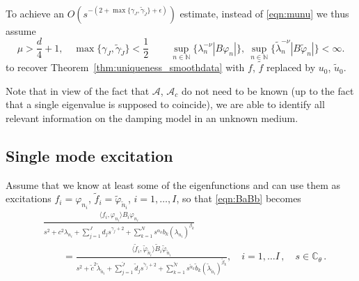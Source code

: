 \begin{remark}
{}
\\
To achieve an $O(s^{-(2+\max\{\gamma_J,\tilde{\gamma}_{\tilde{J}}\}+\epsilon)})$ estimate, instead of \eqref{eqn:munu} we thus assume
\begin{equation}\label{eqn:munu_u0}
\mu>\frac{d}{4}+1,\quad \max\{\gamma_J,\tilde{\gamma}_{\tilde{J}}\}<\frac12\, \quad
\quad
\sup_{n\in\mathbb{N}} \{\lambda_n^{-\nu}|B\varphi_n|\}, \ \sup_{n\in\mathbb{N}} \{\tilde{\lambda}_n^{-\nu}|B\tilde{\varphi}_n|\} <\infty.
\end{equation}
to recover Theorem~\ref{thm:uniqueness_smoothdata} with $f$, $\tilde{f}$ replaced by $u_0$, $\tilde{u}_0$.
\end{remark}

\begin{remark}
Note that in view of the fact that $\mathcal{A}$, $\mathcal{A}_c$ do not need to be known (up to the fact that a single eigenvalue is supposed to coincide), we are able to identify all relevant information on the damping model in an unknown medium.
\end{remark}


\subsection{Single mode excitation}\label{sec:singlemode}
Assume that we know at least some of the eigenfunctions and can use them as excitations $f_{i}=\varphi_{n_i}$, $\tilde{f}_{i}=\tilde{\varphi}_{\tilde{n}_i}$, $i=1,\ldots, I$, so that \eqref{eqn:BaBb} becomes
\begin{equation}\label{eqn:BaBb_singlemodes}
\begin{aligned}
&\frac{\langle f_{i},\varphi_{n_i}\rangle B_i\varphi_{n_i}}{
s^2+c^2\lambda_{n_i}+\sum_{j=1}^J d_j s^{\gamma_j+2}+\sum_{k=1}^N s^{\alpha_k} b_{k}(\lambda_{n_i})^{\beta_{k}}}\\
&\qquad=
\frac{\langle {\tilde f}_{i},{\tilde \varphi}_{\tilde{n}_i}\rangle {\tilde B}_i {\tilde \varphi}_{\tilde{n}_i}}{
s^2+{\tilde c}^2 {\tilde \lambda}_{\tilde{n}_i}+\sum_{j=1}^{\tilde{J}} \tilde{d}_j s^{\tilde{\gamma}_j+2}+\sum_{k=1}^{\tilde N} s^{{\tilde \alpha}_k} {\tilde b}_{k}({\tilde \lambda}_{\tilde{n}_i})^{{\tilde \beta}_{k}}}, \quad i=1,\ldots I\,, \quad s\in\mathbb{C}_\theta\,. \end{aligned}
\end{equation}

